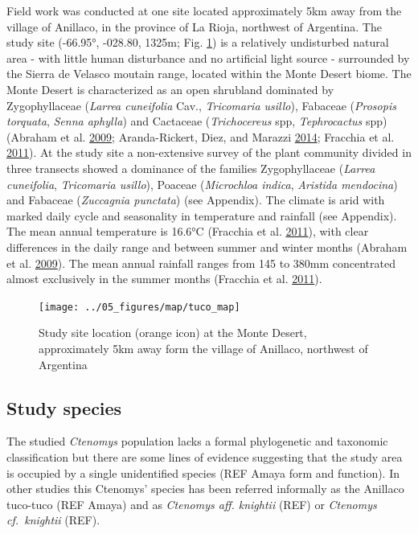 \documentclass[msc,numbers,hidelinks]{coppe}
\begin{document}
  Field work was conducted at one site located approximately 5km away from the village of Anillaco, in the province of La Rioja, northwest of Argentina. The study site (-66.95°, -028.80, 1325m; Fig. \ref{fig:methods-map}) is a relatively undisturbed natural area - with little human disturbance and no artificial light source - surrounded by the Sierra de Velasco moutain range, located within the Monte Desert biome. The Monte Desert is characterized as an open shrubland dominated by Zygophyllaceae (\emph{Larrea cuneifolia} Cav., \emph{Tricomaria usillo}), Fabaceae (\emph{Prosopis torquata}, \emph{Senna aphylla}) and Cactaceae (\emph{Trichocereus} spp, \emph{Tephrocactus} spp) (Abraham et al. \protect\hyperlink{ref-abrahamOverviewGeographyMonte2009}{2009}; Aranda-Rickert, Diez, and Marazzi \protect\hyperlink{ref-aranda-rickertExtrafloralNectarFuels2014}{2014}; Fracchia et al. \protect\hyperlink{ref-fracchiaDispersalArbuscularMycorrhizal2011}{2011}). At the study site a non-extensive survey of the plant community divided in three transects showed a dominance of the families Zygophyllaceae (\emph{Larrea cuneifolia}, \emph{Tricomaria usillo}), Poaceae (\emph{Microchloa indica}, \emph{Aristida mendocina}) and Fabaceae (\emph{Zuccagnia punctata}) (see Appendix). The climate is arid with marked daily cycle and seasonality in temperature and rainfall (see Appendix). The mean annual temperature is 16.6°C (Fracchia et al. \protect\hyperlink{ref-fracchiaDispersalArbuscularMycorrhizal2011}{2011}), with clear differences in the daily range and between summer and winter months (Abraham et al. \protect\hyperlink{ref-abrahamOverviewGeographyMonte2009}{2009}). The mean annual rainfall ranges from 145 to 380mm concentrated almost exclusively in the summer months (Fracchia et al. \protect\hyperlink{ref-fracchiaDispersalArbuscularMycorrhizal2011}{2011}).
  \begin{figure}
  \texttt{[image: ../05\_figures/map/tuco\_map]} \caption{Study site location (orange icon) at the Monte Desert, approximately 5km away form the village of Anillaco, northwest of Argentina}\label{fig:methods-map}
  \end{figure}
  \hypertarget{study-species}{%
  \subsection{Study species}\label{study-species}}

  The studied \emph{Ctenomys} population lacks a formal phylogenetic and taxonomic classification but there are some lines of evidence suggesting that the study area is occupied by a single unidentified species (REF Amaya form and function). In other studies this Ctenomys' species has been referred informally as the Anillaco tuco-tuco (REF Amaya) and as \emph{Ctenomys aff. knightii} (REF) or \emph{Ctenomys cf.~knightii} (REF).
\end{document}

